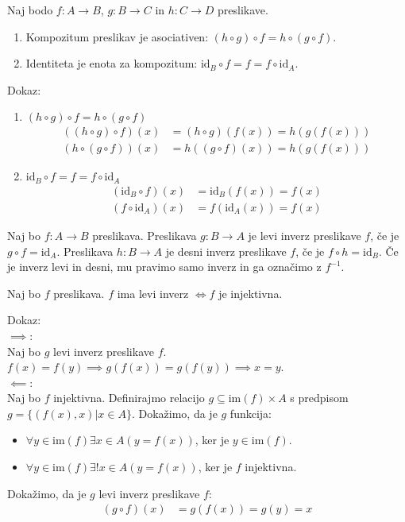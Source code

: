 \begin{trditev}
    Naj bodo $f: A \to B$, $g: B \to C$ in $h: C \to D$ preslikave.
    \begin{enumerate}
        \item Kompozitum preslikav je asociativen: $(h \circ g) \circ f = h \circ (g \circ f)$.
        \item Identiteta je enota za kompozitum: $\text{id}_B \circ f = f = f \circ \text{id}_A$.
    \end{enumerate}
\end{trditev}
Dokaz:
\begin{enumerate}
    \item $(h \circ g) \circ f = h \circ (g \circ f)$
    \begin{align*}
        ((h \circ g) \circ f)(x) &= (h \circ g)(f(x)) = h(g(f(x))) \\
        (h \circ (g \circ f))(x) &= h((g \circ f)(x)) = h(g(f(x)))
    \end{align*}
    \item $\text{id}_B \circ f = f = f \circ \text{id}_A$
    \begin{align*}
        (\text{id}_B \circ f)(x) &= \text{id}_B(f(x)) = f(x) \\
        (f \circ \text{id}_A)(x) &= f(\text{id}_A(x)) = f(x)
    \end{align*}
\end{enumerate}

\begin{definicija}
    Naj bo $f: A \to B$ preslikava.
    Preslikava $g: B \to A$ je levi inverz preslikave $f$, če je $g \circ f = \text{id}_A$.
    Preslikava $h: B \to A$ je desni inverz preslikave $f$, če je $f \circ h = \text{id}_B$.
    Če je inverz levi in desni, mu pravimo samo inverz in ga označimo z $f^{-1}$.
\end{definicija}

\begin{trditev}
    Naj bo $f$ preslikava.
    $f$ ima levi inverz $\iff f$ je injektivna.
\end{trditev}
Dokaz: \\
$\implies$: \\
Naj bo $g$ levi inverz preslikave $f$.
$f(x) = f(y) \implies g(f(x)) = g(f(y)) \implies x = y$. \\

$\impliedby$: \\
Naj bo $f$ injektivna.
Definirajmo relacijo $g \subseteq \text{im}(f) \times A$ s predpisom $g = \{(f(x), x) | x \in A\}$.
Dokažimo, da je $g$ funkcija:
\begin{itemize}
    \item $\forall y \in \text{im}(f) \exists x \in A(y = f(x))$, ker je $y \in \text{im}(f)$.
    \item $\forall y \in \text{im}(f) \exists! x \in A(y = f(x))$, ker je $f$ injektivna.
\end{itemize}
Dokažimo, da je $g$ levi inverz preslikave $f$:
\begin{align*}
    (g \circ f)(x) &= g(f(x)) = g(y) = x
\end{align*}

